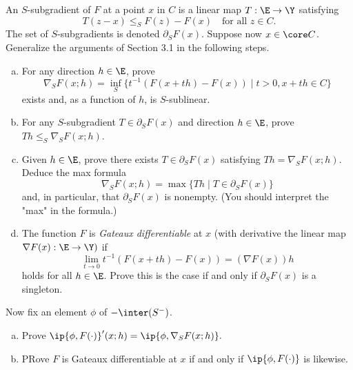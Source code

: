\documentclass[../borwein-lewis_notes.tex]{subfiles}
\begin{document}
An $S$-subgradient of $F$ at a point $x$ in $C$ is a linear map 
$T:\E\to\Y$ satisfying 
\begin{equation*}
T(z-x) \leq_S F(z) - F(x) \quad \text{for all }z\in C.
\end{equation*}
The set of $S$-subgradients is denoted $\partial_SF(x)$. Suppose now 
$x\in\core C$. Generalize the arguments of Section 3.1 in the following 
steps.
\begin{enumerate}[(a),resume]
\item For any direction $h\in\E$, prove 
\begin{equation*}
\nabla_S F(x;h) = \inf_S\{t^{-1}(F(x+th)-F(x))\mid t>0, x+th\in C\}
\end{equation*}
exists and, as a function of $h$, is $S$-sublinear.
\item For any $S$-subgradient $T\in\partial_SF(x)$ and direction $h\in
\E$, prove $Th\leq_S \nabla_SF(x;h)$.
\item Given $h\in\E$, prove there exists $T\in\partial_SF(x)$ satisfying
$Th=\nabla_SF(x;h)$. Deduce the max formula 
\begin{equation*}
\nabla_SF(x;h) = \max\{Th\mid T\in\partial_SF(x)\}
\end{equation*}
and, in particular, that $\partial_SF(x)$ is nonempty. (You should 
interpret the "max" in the formula.)
\item The function $F$ is \textit{Gateaux differentiable} at $x$ 
(with derivative the linear map $\nabla F(x):\E\to\Y)$ if 
\begin{equation*}
\lim_{t\to0}t^{-1}(F(x+th)-F(x)) = (\nabla F(x))h
\end{equation*}
holds for all $h\in\E$. Prove this is the case if and only if 
$\partial_SF(x)$ is a singleton.
\end{enumerate}
Now fix an element $\phi$ of $-\inter(S^-)$.
\begin{enumerate}[(a),resume]
\item Prove $\ip{\phi, F(\cdot)}'(x;h) = \ip{\phi,\nabla_SF(x;h)}.$
\item PRove $F$ is Gateaux differentiable at $x$ if and only if
$\ip{\phi, F(\cdot)}$ is likewise.
\end{enumerate}
\end{document}
